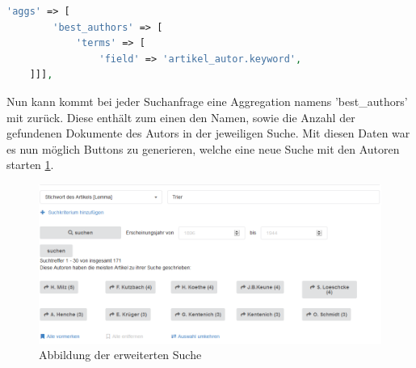 \begin{lstlisting}[language=PHP, frame=single, label={lst:bestAuthors}] 
    'aggs' => [
        'best_authors' => [
            'terms' => [
                'field' => 'artikel_autor.keyword',
    ]]],
\end{lstlisting}


Nun kann kommt bei jeder Suchanfrage eine Aggregation namens 'best\_authors' mit zurück. Diese enthält zum einen den Namen, sowie die Anzahl der gefundenen Dokumente des Autors in der jeweiligen Suche. 
Mit diesen Daten war es nun möglich Buttons zu generieren, welche eine neue Suche mit den Autoren starten \ref{img:erweiterteSuche}.


\begin{figure}
	\centering
	\includegraphics[width=1\linewidth]{images/best_authors.png}
	\caption{Abbildung der erweiterten Suche}
	\label{img:erweiterteSuche}
\end{figure}
